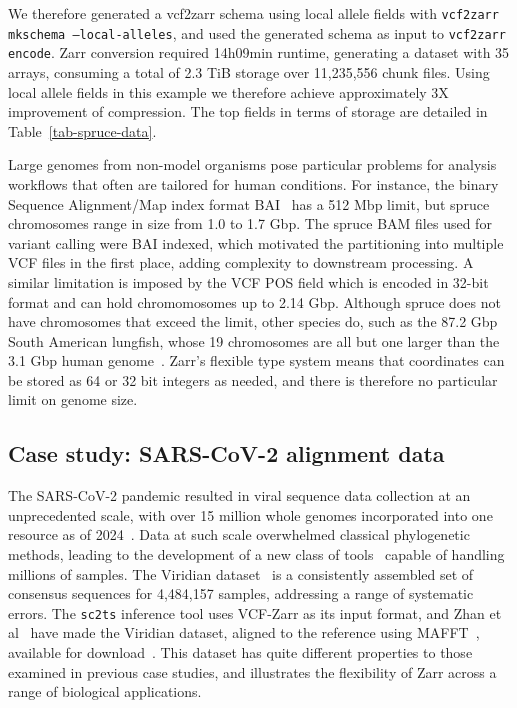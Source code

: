 \documentclass[a4paper,num-refs]{oup-contemporary}
\begin{document}
We therefore generated a vcf2zarr schema
using local allele fields with \texttt{vcf2zarr
mkschema --local-alleles}, and used the generated schema as input to
\texttt{vcf2zarr encode}. Zarr conversion required 14h09min runtime,
generating a dataset with 35 arrays, consuming a total of 2.3 TiB
storage over 11,235,556 chunk files. 
Using local allele fields in this example we therefore 
achieve approximately 3X improvement of compression. 
The top fields in terms of storage are
detailed in Table~\ref{tab-spruce-data}.

Large genomes from non-model organisms pose particular problems for
analysis workflows that often are tailored for human conditions. For
instance, the binary Sequence Alignment/Map index format
BAI~\cite{li2009sequence} has a 512
Mbp limit, but spruce chromosomes range in size from 1.0 to 1.7 Gbp.
The spruce BAM files used for variant calling were BAI indexed, which
motivated the partitioning into multiple VCF files in the first place,
adding complexity to downstream processing.
A similar limitation is imposed by the VCF POS field which is encoded
in 32-bit format and can hold chromomosomes up to 2.14 Gbp. Although
spruce does not have chromosomes that exceed the limit, other species
do, such as the 87.2 Gbp South American lungfish, whose 19 chromosomes
are all but one larger than the 3.1 Gbp human
genome~\cite{schartl_GenomesAllLungfish_2024}. Zarr's flexible type
system means that coordinates can be stored as 64 or 32 bit integers
as needed, and there is therefore no particular limit on genome size.

\subsection{Case study: SARS-CoV-2 alignment data}
The SARS-CoV-2 pandemic resulted in viral sequence data collection at
an unprecedented scale, with over 15 million whole genomes incorporated into
one resource as of 2024~\citep{hinrichs2024ongoing}. Data at such scale
overwhelmed classical phylogenetic methods, leading to the development
of a new class of tools~\citep{turakhia2021ultrafast,ye2022matoptimize,zhan2023towards}
capable of handling millions of samples.
The Viridian dataset~\citep{hunt2024addressing} is a consistently assembled
set of consensus sequences for 4,484,157 samples, addressing a range of systematic
errors. The \texttt{sc2ts} inference tool uses VCF-Zarr as its
input format, and Zhan et al~\citep{zhan2023towards} have made the Viridian dataset,
aligned to the reference using MAFFT~\citep{katoh2013mafft},
available for download~\citep{kelleher2025viridian}. This dataset has quite
different properties to those examined in previous case studies, and
illustrates the flexibility of Zarr across a range of biological applications.
\end{document}
